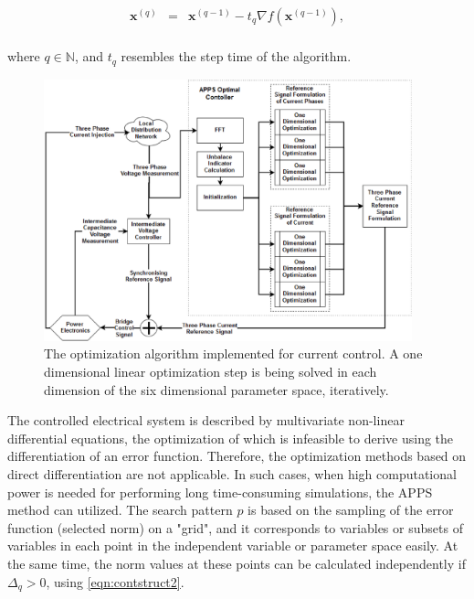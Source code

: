         \begin{equation}
        \begin{array}{rcl}
        \label{eqn:contstruct1}
         \textbf{x}^{(q)}&=&\textbf{x}^{(q-1)}-t_q\nabla f(\textbf{x}^{(q-1)}),\\
         \end{array}
        \end{equation}

        where $q\in\mathbb{N}$, and $t_q$ resembles the step time of the algorithm.

        \begin{figure}[h]
        \centering
        \includegraphics[width=0.95\textwidth]{Unblance_EPS_Pics/APPS_1_2_.eps}
        \caption{The optimization algorithm implemented for current control. A one dimensional linear optimization step is being solved in each dimension of the six dimensional parameter space, iteratively.}
        \label{fig:APPS}
        \end{figure}

         The controlled electrical system is described by multivariate non-linear differential equations, the optimization of which is infeasible to derive using the differentiation of an error function. Therefore, the optimization methods based on direct differentiation are not applicable. In such cases, when high computational power is needed for performing long time-consuming simulations, the APPS method can utilized. The search pattern $p$ is based on the sampling of the error function (selected norm) on a "grid", and it corresponds to variables or subsets of variables in each point in the independent variable or parameter space easily. At the same time, the norm values at these points can be calculated independently if $\Delta_q>0$, using \ref{eqn:contstruct2}.
				
